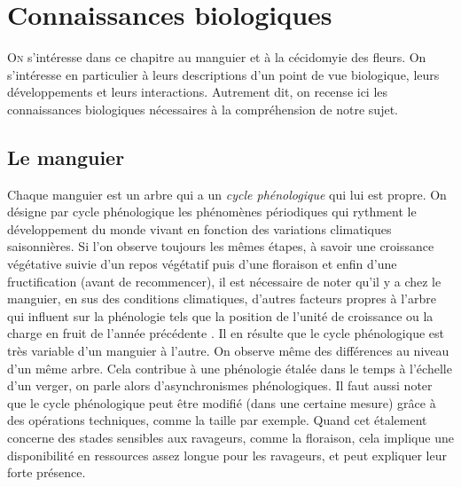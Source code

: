 \chapter{Connaissances biologiques} 

\lettrine{O}{n} s'intéresse dans ce chapitre au manguier et à la cécidomyie des fleurs.
On s'intéresse en particulier à leurs descriptions d'un point de vue biologique, leurs développements et leurs interactions.
Autrement dit, on recense ici les connaissances biologiques nécessaires à la compréhension de notre sujet.


\section{Le manguier}

Chaque manguier est un arbre qui a un \emph{cycle phénologique} qui lui est propre.
On désigne par cycle phénologique les phénomènes périodiques qui rythment le développement du monde vivant en fonction des variations climatiques saisonnières.
Si l'on observe toujours les mêmes étapes, à savoir une croissance végétative suivie d'un repos végétatif puis d'une floraison et enfin d'une fructification (avant de recommencer),
il est nécessaire de noter qu'il y a chez le manguier, en sus des conditions climatiques, d'autres facteurs propres à l'arbre qui influent sur la phénologie tels que la position de l'unité de croissance ou la charge en fruit de l'année précédente \citep{magne2004effet, normand2009axis}.
Il en résulte que le cycle phénologique est très variable d'un manguier à l'autre.
On observe même des différences au niveau d'un même arbre.
Cela contribue à une phénologie étalée dans le temps à l'échelle d'un verger, on parle alors d'asynchronismes phénologiques.
Il faut aussi noter que le cycle phénologique peut être modifié (dans une certaine mesure) grâce à des opérations techniques, comme la taille par exemple.
Quand cet étalement concerne des stades sensibles aux ravageurs, comme la floraison, cela implique une disponibilité en ressources assez longue pour les ravageurs, et peut expliquer leur forte présence.

